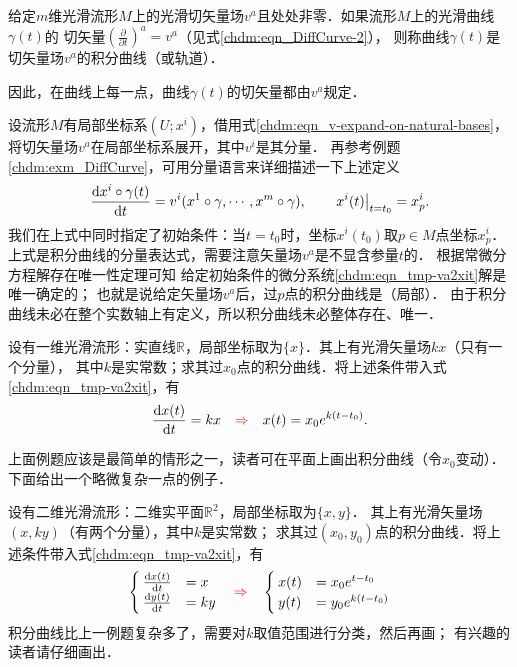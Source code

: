 \begin{definition}
    给定$m$维光滑流形$M$上的光滑切矢量场$v^a$且处处非零．如果流形$M$上的光滑曲线$\gamma(t)$的
    切矢量$(\frac{\partial}{\partial t})^a = v^a$（见式\eqref{chdm:eqn_DiffCurve-2}），
    则称曲线$\gamma(t)$是切矢量场$v^a$的{\heiti 积分曲线}（或{\heiti 轨道}）．
\end{definition}
因此，在曲线上每一点，曲线$\gamma(t)$的切矢量都由$v^a$规定．

设流形$M$有局部坐标系$(U;x^i)$，借用式\eqref{chdm:eqn_v-expand-on-natural-bases}，
将切矢量场$v^a$在局部坐标系展开，其中$v^i$是其分量．
再参考例题\ref{chdm:exm_DiffCurve}，可用分量语言来详细描述一下上述定义
\begin{equation}\label{chdm:eqn_tmp-va2xit}
    \frac{{\rm d} x^i\circ\gamma(t)}{{\rm d} t}=v^i(x^1\circ\gamma,\cdots,x^m\circ\gamma), 
    \qquad \left. x^i(t) \right|_{t=t_0} = x^i_p  . 
\end{equation}
我们在上式中同时指定了初始条件：当$t=t_0$时，坐标$x^i(t_0)$取$p\in M$点坐标$x^i_p$．
上式是积分曲线的分量表达式，需要注意矢量场$v^a$是不显含参量$t$的．
根据常微分方程解存在唯一性定理\cite[\S 31]{arnold-2001-ode}可知
给定初始条件的微分系统\eqref{chdm:eqn_tmp-va2xit}解是唯一确定的；
也就是说给定矢量场$v^a$后，过$p$点的积分曲线是（局部）．
由于积分曲线未必在整个实数轴上有定义，所以积分曲线未必整体存在、唯一．

\begin{example}
    设有一维光滑流形：实直线$\mathbb{R}$，局部坐标取为$\{x\}$．其上有光滑矢量场$k x$（只有一个分量），
    其中$k$是实常数；求其过$x_0$点的积分曲线．将上述条件带入式\eqref{chdm:eqn_tmp-va2xit}，有
    \begin{equation}
        \frac{{\rm d} x(t)}{{\rm d} t}= k x 
        \quad {\color{red}\Rightarrow} \quad
        x(t)= x_0 e^{k(t-t_0)}.
    \end{equation}
\end{example}
上面例题应该是最简单的情形之一，读者可在平面上画出积分曲线（令$x_0$变动）．
下面给出一个略微复杂一点的例子．
\begin{example}
    设有二维光滑流形：二维实平面$\mathbb{R}^2$，局部坐标取为$\{x,y\}$．
    其上有光滑矢量场$(x,ky)$（有两个分量），其中$k$是实常数；
    求其过$(x_0,y_0)$点的积分曲线．将上述条件带入式\eqref{chdm:eqn_tmp-va2xit}，有
    \begin{equation}
        \begin{cases}
            \frac{{\rm d} x(t)}{{\rm d} t}& =  x \\
            \frac{{\rm d} y(t)}{{\rm d} t}&= k y
        \end{cases}
        \quad {\color{red}\Rightarrow} \quad
        \begin{cases}
            x(t)& =  x_0 e^{t-t_0} \\
            y(t)& =  y_0 e^{k(t-t_0)} 
        \end{cases}
    \end{equation}
积分曲线比上一例题复杂多了，需要对$k$取值范围进行分类，然后再画；
有兴趣的读者请仔细画出．
\end{example}

